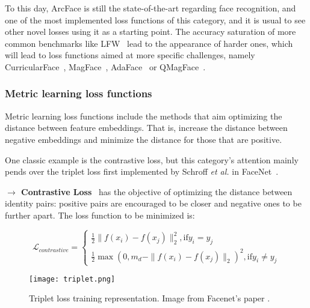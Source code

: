 \documentclass[class=report, crop=false, a4paper, 12pt]{standalone}
\begin{document}
\par To this day, ArcFace is still the state-of-the-art regarding face recognition, and one of the most implemented loss functions of this category, and it is usual to see other novel losses using it as a starting point. The accuracy saturation of more common benchmarks like LFW~\autocite{huangLabeledFacesWild} lead to the appearance of harder ones, which will lead to loss functions aimed at more specific challenges, namely CurricularFace~\autocite{huangCurricularFaceAdaptiveCurriculum2020}, MagFace~\autocite{mengMagFaceUniversalRepresentation2021}, AdaFace~\autocite{kimAdaFaceQualityAdaptive2022} or QMagFace~\autocite{terhorstQMagFaceSimpleAccurate2023}.

\subsubsection{Metric learning loss functions}
Metric learning loss functions include the methods that aim optimizing the distance between feature embeddings. That is, increase the distance between negative embeddings and minimize the distance for those that are positive.
\par One classic example is the contrastive loss, but this category's attention mainly pends over the triplet loss first implemented by Schroff \textit{et al.} in FaceNet~\autocite{schroffFaceNetUnifiedEmbedding2015}. 

\vspace{0.7\baselineskip}
\noindent\textbf{$\rightarrow$ Contrastive Loss}~\autocite{duElementsEndtoendDeep2022} has the objective of optimizing the distance between identity pairs: positive pairs are encouraged to be closer and negative ones to be further apart. The loss function to be minimized is:

\begin{equation}
    \mathcal{L}_{contrastive} = 
    \begin{cases}
      \frac{1}{2}\|f(x_i)-f(x_j)\|^{2}_{2}, \text{if} y_i=y_j\\
      \frac{1}{2}\max{(0, m_d-\|f(x_i)-f(x_j)\|_2)^2}, \text{if} y_i\neq y_j
    \end{cases}
\end{equation}

\begin{figure}[!h]
    \centering
    \texttt{[image: triplet.png]}
    \caption[Triplet loss training representation.]{Triplet loss training representation. Image from Facenet's paper \autocite{schroffFaceNetUnifiedEmbedding2015}.}
    \label{fig:triplet}
\end{figure}
\end{document}
